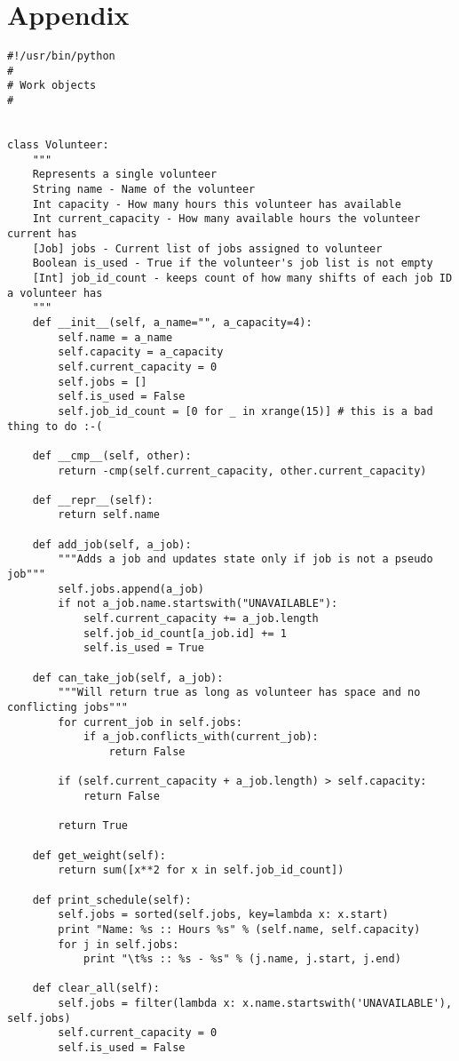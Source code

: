 \documentclass[11pt]{article}
\theoremstyle{definition}
\begin{document}
\section{Appendix}
\begin{lstlisting}
#!/usr/bin/python
#
# Work objects
#


class Volunteer:
    """
    Represents a single volunteer
    String name - Name of the volunteer
    Int capacity - How many hours this volunteer has available
    Int current_capacity - How many available hours the volunteer current has
    [Job] jobs - Current list of jobs assigned to volunteer
    Boolean is_used - True if the volunteer's job list is not empty
    [Int] job_id_count - keeps count of how many shifts of each job ID a volunteer has
    """
    def __init__(self, a_name="", a_capacity=4):
        self.name = a_name
        self.capacity = a_capacity
        self.current_capacity = 0
        self.jobs = []
        self.is_used = False
        self.job_id_count = [0 for _ in xrange(15)] # this is a bad thing to do :-(

    def __cmp__(self, other):
        return -cmp(self.current_capacity, other.current_capacity)

    def __repr__(self):
        return self.name

    def add_job(self, a_job):
        """Adds a job and updates state only if job is not a pseudo job"""
        self.jobs.append(a_job)
        if not a_job.name.startswith("UNAVAILABLE"):
            self.current_capacity += a_job.length
            self.job_id_count[a_job.id] += 1
            self.is_used = True

    def can_take_job(self, a_job):
        """Will return true as long as volunteer has space and no conflicting jobs"""
        for current_job in self.jobs:
            if a_job.conflicts_with(current_job):
                return False

        if (self.current_capacity + a_job.length) > self.capacity:
            return False

        return True

    def get_weight(self):
        return sum([x**2 for x in self.job_id_count])

    def print_schedule(self):
        self.jobs = sorted(self.jobs, key=lambda x: x.start)
        print "Name: %s :: Hours %s" % (self.name, self.capacity)
        for j in self.jobs:
            print "\t%s :: %s - %s" % (j.name, j.start, j.end)

    def clear_all(self):
        self.jobs = filter(lambda x: x.name.startswith('UNAVAILABLE'), self.jobs)
        self.current_capacity = 0
        self.is_used = False



\end{lstlisting}
\end{document}
